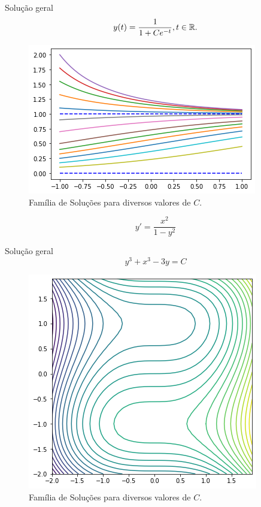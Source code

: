 \begin{frame}
\begin{block}{Solução geral}
\[y(t)=\frac{1}{1+Ce^{-t}}, t\in \mathbb{R}.\]
\end{block}
\begin{figure}
\centering
\includegraphics[scale=0.65]{sol-logistico-capa.png}
\caption{Família de Soluções para diversos valores de $C$.}
\end{figure}
\end{frame}


\begin{frame}

\begin{exe}
\[y'=\frac{x^2}{1-y^2}\]
\end{exe}

Solução geral
\[y^3+x^3-3y=C\]

\begin{figure}
\centering
\includegraphics[scale=0.35]{sol-ex-sep.png}
\caption{Família de Soluções para diversos valores de $C$.}
\end{figure}

\end{frame}


